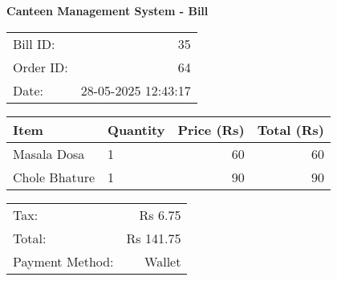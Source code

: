 \documentclass[a4paper,12pt]{article}
\begin{document}
\centering
\textbf{Canteen Management System - Bill}\\
\vspace{0.5cm}
\begin{tabular}{lr}
Bill ID: & 35 \\
Order ID: & 64 \\
Date: & 28-05-2025 12:43:17 \\
\end{tabular}
\vspace{0.5cm}
\begin{tabular}{llrr}
\toprule
Item & Quantity & Price (Rs) & Total (Rs) \\
\midrule
Masala Dosa & 1 & \num{60} & \num{60} \\
Chole Bhature & 1 & \num{90} & \num{90} \\
\bottomrule
\end{tabular}
\vspace{0.5cm}
\begin{tabular}{lr}
Tax: & Rs \num{6.75} \\
Total: & Rs \num{141.75} \\
Payment Method: & Wallet \\
\end{tabular}
\end{document}
